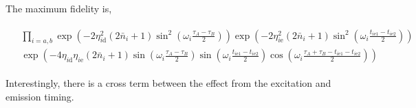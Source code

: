 \documentclass[10pt,fleqn]{article}
\newcommand{\eqar}[1]
{
  \begin{align}
    #1
  \end{align}
}
\newcommand{\paren}[1]{{\left({#1}\right)}}
\begin{document}
The maximum fidelity is,
\eqar{
  \begin{split}
    &\prod_{i=a,b}\exp\paren{-2\eta_{i\mathrm{d}}^2\paren{2\bar n_i+1}\sin^2\paren{\omega_i\frac{\tau_A-\tau_B}{2}}}\exp\paren{-2\eta_{i\mathrm{e}}^2\paren{2\bar n_i+1}\sin^2\paren{\omega_i\frac{t_{i\mathrm{e}1}-t_{i\mathrm{e}2}}{2}}}\\
    &\exp\paren{-4\eta_{i\mathrm{d}}\eta_{i\mathrm{e}}\paren{2\bar n_i+1}
      \sin\paren{\omega_i\frac{\tau_A-\tau_B}{2}}
      \sin\paren{\omega_i\frac{t_{i\mathrm{e}1}-t_{i\mathrm{e}2}}{2}}
      \cos\paren{\omega_i\frac{\tau_A+\tau_B-t_{i\mathrm{e}1}-t_{i\mathrm{e}2}}{2}}}
  \end{split}
}
Interestingly, there is a cross term between the effect from the excitation and emission timing.
\end{document}
